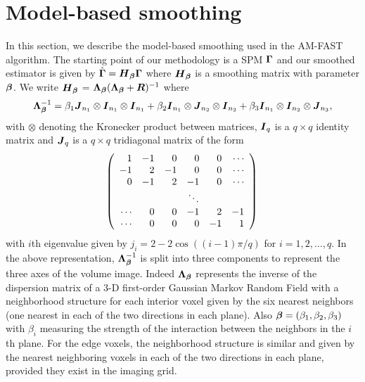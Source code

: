 \section{Model-based smoothing}
\label{mb.smooth}
In this section, we describe the model-based smoothing used in the
AM-FAST algorithm. The starting point of our methodology is a SPM
$\boldsymbol{\Gamma}$ and our smoothed estimator is given by $\hat{\boldsymbol{\Gamma}} = \boldsymbol{H}_{\boldsymbol{\beta}}\boldsymbol{\Gamma}$
where $\boldsymbol{H}_{\boldsymbol{\beta}}$ is a smoothing matrix with parameter $\boldsymbol{\beta}$. We
write $\boldsymbol{H}_{\boldsymbol{\beta}}$ = $\boldsymbol{\Lambda}_{\boldsymbol{\beta}}(\boldsymbol{\Lambda}_{\boldsymbol{\beta}}+\boldsymbol{R})^{-1}$ where
\begin{equation}
  \boldsymbol{\Lambda}_{\boldsymbol{\beta}}^{-1} =  \beta_1 \boldsymbol{J}_{n_1} \otimes \boldsymbol{I}_{n_1} \otimes \boldsymbol{I}_{n_1} + \beta_2 \boldsymbol{I}_{n_1}
\otimes \boldsymbol{J}_{n_2} \otimes \boldsymbol{I}_{n_2} + 
                  \beta_3 \boldsymbol{I}_{n_1} \otimes \boldsymbol{I}_{n_2} \otimes
                  \boldsymbol{J}_{n_3}, 
\end{equation}
with  $\otimes$ denoting the Kronecker product between matrices,
$\boldsymbol{I}_q$ is a $q\times q$ identity matrix and $\boldsymbol{J}_q$ is a $q\times q$
tridiagonal matrix of the form  
\begin{equation}
\left( \begin{array}{rrrrrr}
1 & -1 & 0 & 0 & 0 & \cdots\\
-1 & 2 & -1 & 0 & 0 & \cdots\\
0 & -1 & 2 & -1 & 0 & \cdots\\
 & & & \ddots & & \\
\cdots & 0 & 0 & -1 & 2 & -1\\
\cdots & 0 & 0 & 0 & -1 & 1\\
\end{array}
\right)\\
\end{equation}
with $i$th eigenvalue given by $j_i = 2-2\cos((i-1)\pi/q)$ for $i=1,2,\ldots,q$.
In the above representation, $\boldsymbol{\Lambda}_{\boldsymbol{\beta}}^{-1}$ is split into three
components to represent the three axes of the volume image. Indeed
$\boldsymbol{\Lambda}_{\boldsymbol{\beta}}$ represents the inverse of the dispersion matrix of a 
3-D first-order Gaussian Markov Random Field with a neighborhood
structure for each interior voxel given by the six nearest neighbors
(one nearest in each of the two directions in each plane). Also
$\boldsymbol{\beta} = (\beta_1,\beta_2,\beta_3)$ with $\beta_i$ measuring the
strength of the interaction between the neighbors in the $i$th plane.
For the edge voxels, the neighborhood
structure is similar and given by the nearest neighboring voxels in
each of the two directions in each plane, provided they exist in the
imaging grid.

